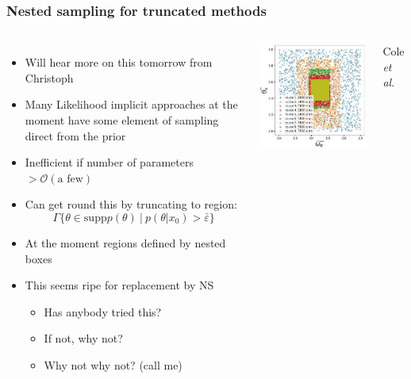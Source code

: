\documentclass[aspectratio=169]{beamer}
\begin{document}
\begin{frame}
    \frametitle{Nested sampling for truncated methods}

    \begin{columns}
        \begin{itemize}
            \item Will hear more on this tomorrow from Christoph
            \item Many Likelihood implicit approaches at the moment have some element of sampling direct from the prior
            \item Inefficient if number of parameters $>\mathcal{O}(\text{a few})$
            \item Can get round this by truncating to region:
                \[ \Gamma\{ \theta\in \mathrm{supp} p(\theta) \:|\: p(\theta|x_0)>\bar\varepsilon\} \]
            \item At the moment regions defined by nested boxes
            \item This seems ripe for replacement by NS
                \begin{itemize}
                    \item Has anybody tried this?
                    \item If not, why not?
                    \item Why not why not? \hfill(call me)
                \end{itemize}
        \end{itemize}
        \includegraphics[width=\textwidth]{figures/tmnre}

        \hfill Cole \textit{et al.}~
    \end{columns}
    
\end{frame}
\end{document}
